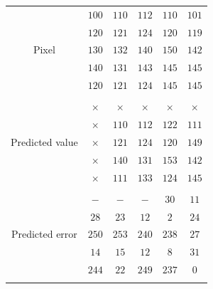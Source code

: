 \documentclass{elsarticle}
\begin{document}
	\begin{figure}[!t]
		\centering
		\scriptsize
		\begin{tabular}{c|c|c|c|c|c|}
			\cline{2-6}
			\multirow{5}{*}{Pixel}
			&\(100\)   & \(110\) & \(112\) & \(110\) & \(101\)   \\ \cline{2-6}
			&\(120\)   & \(121\) & \(124\) & \(120\) & \(119\)   \\ \cline{2-6}
			&\(130\)   & \(132\) & \(140\) & \(150\) & \(142\)   \\ \cline{2-6} 
			&\(140\)   & \(131\) & \(143\) & \(145\) & \(145\)   \\ \cline{2-6}
			&\(120\)   & \(121\) & \(124\) & \(145\) & \(145\)   \\ \cline{2-6}
			
			\multicolumn{6}{c}{{}} \\
			
			\cline{2-6}
			\multirow{5}{*}{Predicted value}
			&\(\times\) & \(\times\) & \(\times\) & \(\times\) &\(\times\) \\ \cline{2-6}
			&\(\times\) & \(110\)    & \(112\)    & \(122\)    & \(111\)   \\ \cline{2-6}
			&\(\times\) & \(121\)    & \(124\)    & \(120\)    & \(149\)   \\ \cline{2-6}
			&\(\times\) & \(140\)    & \(131\)    & \(153\)    & \(142\)   \\ \cline{2-6} 
			&\(\times\) & \(111\)    & \(133\)    & \(124\)    & \(145\)   \\ \cline{2-6}
			
			\multicolumn{6}{c}{{}} \\
			
			\cline{2-6}
			\multirow{5}{*}{Predicted error}
			&\(-\) 		& \(-\) 	 & \(-\) 	  & \(30\)  & \(11\)  \\ \cline{2-6}
			&\(28\)     & \(23\)     & \(12\)     & \(2\)   & \(24\)  \\ \cline{2-6}
			&\(250\)    & \(253\)    & \(240\)    & \(238\) & \(27\)  \\ \cline{2-6}
			&\(14\)     & \(15\)     & \(12\)     & \(8\)   & \(31\)  \\ \cline{2-6} 
			&\(244\)    & \(22\)     & \(249\)    & \(237\) & \(0\)   \\ \cline{2-6}
			
			\multicolumn{6}{c}{{}} \\
			

\end{tabular}
\end{figure}
\end{document}
